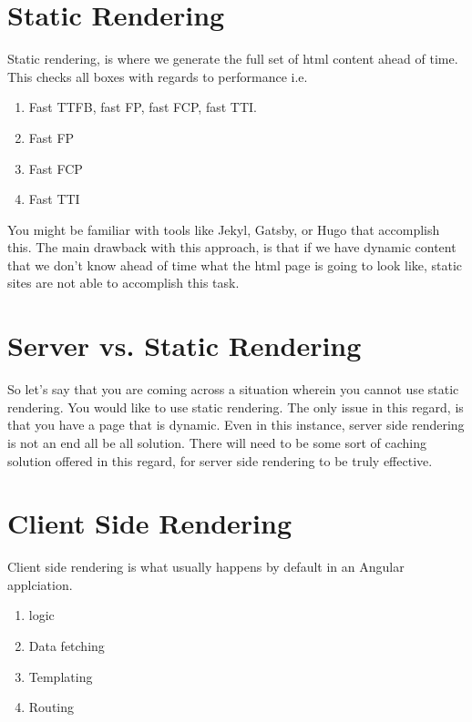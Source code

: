 \section{Static Rendering}
Static rendering, is where we generate the full set of html content ahead of time. This checks all boxes with regards to performance i.e. 
\begin{enumerate}
  \item Fast TTFB, fast FP, fast FCP, fast TTI. 
  \item Fast FP
  \item Fast FCP
  \item Fast TTI  
\end{enumerate}

You might be familiar with tools like Jekyl, Gatsby, or Hugo that accomplish this. The main drawback with this approach, is that if we have dynamic content that we don't know ahead of time what the html page is going to look like, static sites are not able to accomplish this task. 


\section{Server vs. Static Rendering}
So let's say that you are coming across a situation wherein you cannot use static rendering. You would like to use static rendering. The only issue in this regard, is that you have a page that is dynamic. Even in this instance, server side rendering is not an end all be all solution. There will need to be some sort of caching solution offered in this regard, for server side rendering to be truly effective. 

\section{ Client Side Rendering }
Client side rendering is what usually happens by default in an Angular applciation. 
\begin{enumerate}
  \item logic 
  \item Data fetching
  \item Templating 
  \item Routing 
\end{enumerate}

